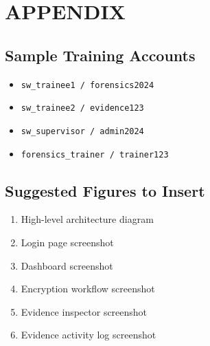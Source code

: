 \documentclass[12pt,a4paper]{report}
\begin{document}
\chapter*{APPENDIX}

\section*{Sample Training Accounts}
\begin{itemize}
\item \texttt{sw\_trainee1 / forensics2024}
\item \texttt{sw\_trainee2 / evidence123}
\item \texttt{sw\_supervisor / admin2024}
\item \texttt{forensics\_trainer / trainer123}
\end{itemize}

\section*{Suggested Figures to Insert}
\begin{enumerate}
\item High-level architecture diagram
\item Login page screenshot
\item Dashboard screenshot
\item Encryption workflow screenshot
\item Evidence inspector screenshot
\item Evidence activity log screenshot
\end{enumerate}
\end{document}
